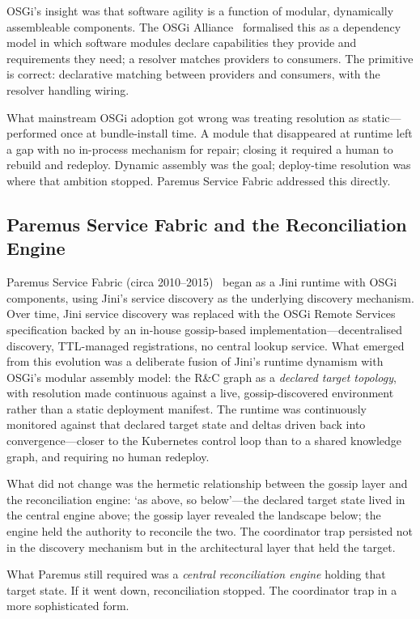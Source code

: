 \documentclass[11pt]{article}
\begin{document}
OSGi's insight was that software agility is a function of modular, dynamically
assembleable components. The OSGi Alliance~\cite{osgi} formalised this as a
dependency model in which software modules declare capabilities they provide and
requirements they need; a resolver matches providers to consumers. The primitive
is correct: declarative matching between providers and consumers, with the
resolver handling wiring.

What mainstream OSGi adoption got wrong was treating resolution as
static---performed once at bundle-install time. A module that disappeared at
runtime left a gap with no in-process mechanism for repair; closing it required
a human to rebuild and redeploy. Dynamic assembly was the goal; deploy-time
resolution was where that ambition stopped. Paremus Service Fabric addressed
this directly.

\subsection{Paremus Service Fabric and the Reconciliation Engine}

Paremus Service Fabric (circa 2010--2015)~\cite{paremus} began as a Jini runtime
with OSGi components, using Jini's service discovery as the underlying discovery
mechanism. Over time, Jini service discovery was replaced with the OSGi Remote
Services specification backed by an in-house gossip-based
implementation---decentralised discovery, TTL-managed registrations, no central
lookup service. What emerged from this evolution was a deliberate fusion of
Jini's runtime dynamism with OSGi's modular assembly model: the R\&C graph as a
\emph{declared target topology}, with resolution made continuous against a live,
gossip-discovered environment rather than a static deployment manifest. The
runtime was continuously monitored against that declared target state and deltas
driven back into convergence---closer to the Kubernetes control loop than to a
shared knowledge graph, and requiring no human redeploy.

What did not change was the hermetic relationship between the gossip layer and
the reconciliation engine: `as above, so below'---the declared target state
lived in the central engine above; the gossip layer revealed the landscape below;
the engine held the authority to reconcile the two. The coordinator trap persisted
not in the discovery mechanism but in the architectural layer that held the
target.

What Paremus still required was a \emph{central reconciliation engine} holding
that target state. If it went down, reconciliation stopped. The coordinator trap
in a more sophisticated form.
\end{document}
